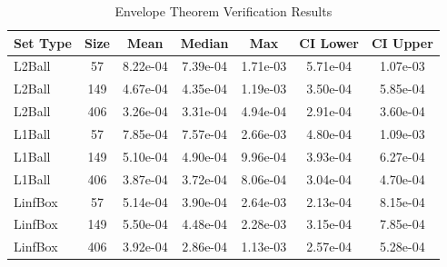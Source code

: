 \begin{table}[htbp]
\centering
\caption{Envelope Theorem Verification Results}
\label{tab:envelope_verification}
\begin{tabular}{lcccccc}
\toprule
\textbf{Set Type} & \textbf{Size} & \textbf{Mean} & \textbf{Median} & \textbf{Max} & \textbf{CI Lower} & \textbf{CI Upper} \\
\midrule
L2Ball & 57 & 8.22e-04 & 7.39e-04 & 1.71e-03 & 5.71e-04 & 1.07e-03 \\
L2Ball & 149 & 4.67e-04 & 4.35e-04 & 1.19e-03 & 3.50e-04 & 5.85e-04 \\
L2Ball & 406 & 3.26e-04 & 3.31e-04 & 4.94e-04 & 2.91e-04 & 3.60e-04 \\
L1Ball & 57 & 7.85e-04 & 7.57e-04 & 2.66e-03 & 4.80e-04 & 1.09e-03 \\
L1Ball & 149 & 5.10e-04 & 4.90e-04 & 9.96e-04 & 3.93e-04 & 6.27e-04 \\
L1Ball & 406 & 3.87e-04 & 3.72e-04 & 8.06e-04 & 3.04e-04 & 4.70e-04 \\
LinfBox & 57 & 5.14e-04 & 3.90e-04 & 2.64e-03 & 2.13e-04 & 8.15e-04 \\
LinfBox & 149 & 5.50e-04 & 4.48e-04 & 2.28e-03 & 3.15e-04 & 7.85e-04 \\
LinfBox & 406 & 3.92e-04 & 2.86e-04 & 1.13e-03 & 2.57e-04 & 5.28e-04 \\
\bottomrule
\end{tabular}
\end{table}
